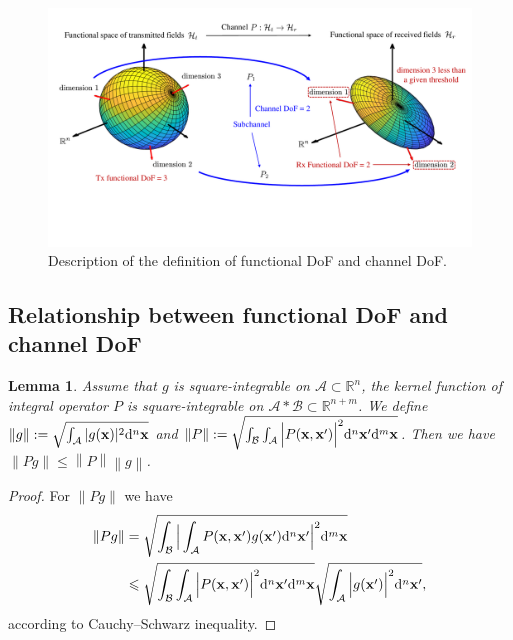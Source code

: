 \documentclass[12pt,draftclsnofoot,journal,onecolumn]{IEEEtran}
\newtheorem{lemma}{Lemma}
\begin{document}
				\begin{figure}
		\centering 
		\includegraphics[width=1\textwidth]{figs/FDoFandCDoF.pdf} 
		\caption{Description of the definition of functional DoF and channel DoF.} 
		\label{FDoFandCDoF}
	\end{figure}

\subsection{\color{red}Relationship between functional DoF and channel DoF}
	
	\begin{lemma}
		Assume that $g$ is square-integrable on $\mathcal{A} \subset \mathbb{R}^n$, the kernel function of integral operator $P$ is square-integrable on $\mathcal{A}*\mathcal{B} \subset \mathbb{R}^{n+m}$.
		We define $\left\|  g \right\|:=\sqrt{\int_{\mathcal{A}}|g({\bf x})|^2{\rm d}^n{\bf x}}$ and $\left\| P \right\|:=\sqrt{\int_{\mathcal{B}} \int_{\mathcal{A}}\Big|P({\bf x},{\bf x}')\Big|^2 {\rm d}^n{\bf x}' {\rm d}^m{\bf x} }$. Then we have $\left\| Pg  \right\| \leqslant \left\| P  \right\|\left\| g  \right\| $.
	\end{lemma}
	\begin{proof}
		For $\left\| Pg  \right\|$ we have
		\begin{equation}
			\begin{aligned}
				\left\|  Pg \right\| &= \sqrt{\int_{\mathcal{B}} \Big|\int_{\mathcal{A}}P({\bf x},{\bf x}')g({\bf x}'){\rm d}^n{\bf x}'\Big|^2{\rm d}^m{\bf x}}
				\\&\leqslant \sqrt{\int_{\mathcal{B}} \int_{\mathcal{A}}\Big|P({\bf x},{\bf x}')\Big|^2 {\rm d}^n{\bf x}' {\rm d}^m{\bf x} }
				\sqrt{\int_{\mathcal{A}}\Big|g({\bf x}')\Big|^2{\rm d}^n{\bf x}'},
			\end{aligned}
		\end{equation}
		according to Cauchy–Schwarz inequality.
	\end{proof}
	
\end{document}
